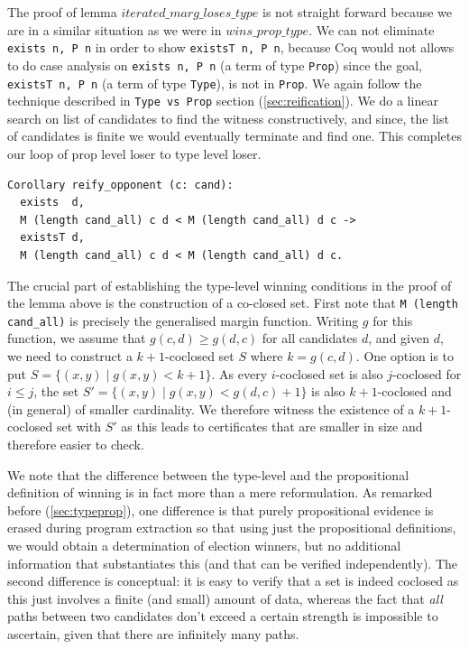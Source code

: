 The proof of lemma  $iterated\_marg\_loses\_type$ is not straight forward because
we are in a similar situation  as we were in $wins\_prop\_type$. 
We can not eliminate \texttt{exists n, P n} in order to show \texttt{existsT n, P n},
because Coq would not allows to do case analysis on \texttt{exists n, P n} (a term of 
type \texttt{Prop}) since the goal, \texttt{existsT n, P n} (a term of type \texttt{Type}), is not in
\texttt{Prop}. We again follow the technique described in 
\texttt{Type vs Prop} section (\ref{sec:reification}).
We do  a linear search on list of candidates  to find the witness constructively, and since, 
the list of candidates is  finite we would eventually terminate and find one.  
This completes our loop of prop level loser to type level loser. 


\begin{verbatim}
Corollary reify_opponent (c: cand):
  exists  d, 
  M (length cand_all) c d < M (length cand_all) d c ->
  existsT d, 
  M (length cand_all) c d < M (length cand_all) d c.
\end{verbatim}



\noindent
The crucial part of establishing the type-level winning conditions
in the proof of the lemma above is the construction of a co-closed set. 
First note that \texttt{M (length cand\_all)} is precisely
the generalised margin function. Writing $g$ for this function, we
assume that $g(c, d) \geq g(d, c)$ for all candidates $d$, and given
$d$, we need to construct a $k+1$-coclosed set $S$ where $k = g(c, d)$.
One option is to put
$S = \lbrace (x, y) \mid g(x, y) < k+1 \rbrace$. As every
$i$-coclosed set is also $j$-coclosed for $i \leq j$, the set $S' =
\lbrace (x, y) \mid g(x, y) < g(d, c) + 1 \rbrace$ is also
$k+1$-coclosed and (in general) of smaller cardinality. We therefore
witness the existence of a $k+1$-coclosed set with $S'$ as this
leads to certificates that are smaller in size and therefore easier
to check.

We note that the difference between the type-level and the
propositional definition of winning 
is in fact more than a mere reformulation. As remarked before (\ref{sec:typeprop}), one
difference is that purely propositional evidence is erased during
program extraction so that using just the propositional definitions,
we would obtain a determination of election winners, but no
additional information that substantiates this (and that can be
verified independently). The second difference is conceptual: it is
easy to verify that a set is indeed coclosed as this just involves a
finite (and small) amount of data, whereas the fact that \emph{all} paths
between two candidates don't exceed a certain strength is impossible
to ascertain, given that there are infinitely many paths.

